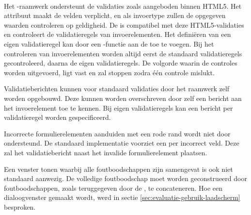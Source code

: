 \paragraph{\kendo}
Het \kendo{}-raamwerk ondersteunt de validaties zoals aangeboden binnen HTML5.
Het  attribuut maakt de velden verplicht,  en  als invoertype zullen de opgegeven waarden controleren op geldigheid.
De \kendo{}  is compatibel met deze HTML5-validaties en controleert de validatieregels van invoerelementen.
Het definiëren van een eigen validatieregel kan door een \js-functie aan de  toe te voegen.
Bij het controleren van invoerelementen worden altijd eerst de standaard validatieregels gecontroleerd,  daarna de eigen validatieregels.
De volgorde waarin de controles worden uitgevoerd, ligt vast en zal stoppen zodra één controle mislukt.

Validatieberichten kunnen voor standaard validaties door het raamwerk zelf worden opgebouwd.
Deze kunnen worden overschreven door zelf een bericht aan het invoerelement toe te kennen.
Bij eigen validatieregels kan een bericht per validatieregel worden gespecificeerd.

Incorrecte formulierelementen aanduiden met een rode rand wordt niet door \kendo{} ondersteund.
De standaard implementatie voorziet een  per incorrect veld.
Deze zal het validatiebericht naast het invalide formulierelement plaatsen. 

Een venster tonen waarbij alle foutboodschappen zijn samengevat is ook niet standaard aanwezig.
De volledige foutboodschap moet worden geconstrueerd door foutboodschappen,  zoals teruggegeven door de , te concateneren.
Hoe een dialoogvenster gemaakt wordt, werd in sectie \ref{sec:evaluatie-gebruik-laadscherm} besproken.

